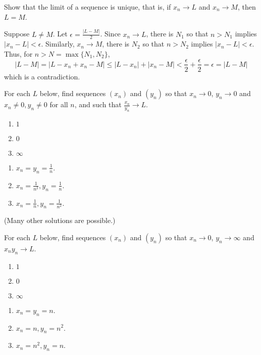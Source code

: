 \documentclass[11pt,dvipsnames]{book}
\numberwithin{equation}{section} %
\numberwithin{figure}{section} %
\numberwithin{table}{section} %
\begin{document}
\begin{exercise}
Show that the limit of a sequence is unique, that is, if $x_{n}\rightarrow L$ and $x_{n}\rightarrow M$, then $L=M$.
\begin{solution}
Suppose $L\neq M$. Let $\epsilon=\frac{|L-M|}{2}$. Since $x_{n}\rightarrow L$, there is $N_1$ so that $n> N_1$ implies $|x_{n}-L|<\epsilon$. Similarly, $x_{n}\rightarrow M$, there is $N_2$ so that $n> N_2$ implies $|x_{n}-L|<\epsilon$. Thus, for $n>N= \max\{N_1,N_2\}$,
\[
|L-M|=|L-x_{n}+x_{n}-M|\leq |L-x_{n}|+|x_{n}-M|<\frac{\epsilon}{2}+\frac{\epsilon}{2} = \epsilon = |L-M|
\]
which is a contradiction.
\end{solution}
\end{exercise}


 \begin{exercise}
For each $L$ below, find sequences $(x_{n})$ and $(y_{n})$ so that $x_{n}\rightarrow 0$, $y_{n}\rightarrow 0$ and $x_{n}\neq 0, y_n \neq 0$ for all $n$, and such that $\frac{x_{n}}{y_{n}}\rightarrow L$. 
\begin{enumerate}[label=(\alph*)]
\item $1$
\item $0$
\item $\infty$
\end{enumerate}
\begin{solution}
\begin{enumerate}[label=(\alph*)]
\item $x_n=y_n=\frac{1}{n}$.
\item $x_n=\frac{1}{n^2}, y_n=\frac{1}{n}$.
\item $x_n=\frac{1}{n}, y_n=\frac{1}{n^2}$.
\end{enumerate}
(Many other solutions are possible.)
\end{solution}
\end{exercise}

 \begin{exercise}
For each $L$ below, find sequences $(x_{n})$ and $(y_{n})$ so that $x_{n}\rightarrow 0$, $y_{n}\rightarrow \infty$ and $x_{n}y_{n}\rightarrow L$. 
\begin{enumerate}[label=(\alph*)]
\item $1$
\item $0$
\item $\infty$
\end{enumerate}
\begin{solution}
\begin{enumerate}[label=(\alph*)]
\item $x_n=y_n=n$.
\item $x_n=n, y_n=n^2$.
\item $x_n=n^2, y_n=n$.
\end{enumerate}
\end{solution}
\end{exercise}
 
\end{document}
